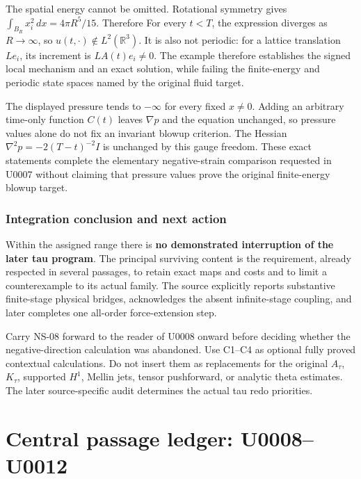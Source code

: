 The spatial energy cannot be omitted. Rotational symmetry gives
\(\int_{B_R}x_i^2\,dx=4\pi R^5/15\). Therefore  For every \(t<T\), the expression diverges as \(R\to\infty\), so
\(u(t,\cdot)\notin L^2(\mathbb R^3)\). It is also not periodic: for a
lattice translation \(Le_i\), its increment is \(LA(t)e_i\ne0\). The
example therefore establishes the signed local mechanism and an exact
solution, while failing the finite-energy and periodic state spaces
named by the original fluid target.

The displayed pressure tends to \(-\infty\) for every fixed \(x\ne0\).
Adding an arbitrary time-only function \(C(t)\) leaves \(\nabla p\) and
the equation unchanged, so pressure values alone do not fix an invariant
blowup criterion. The Hessian \(\nabla^2p=-2(T-t)^{-2}I\) is unchanged
by this gauge freedom. These exact statements complete the elementary
negative-strain comparison requested in U0007 without claiming that
pressure values prove the original finite-energy blowup target.

\subsubsection{Integration conclusion and next
action}\label{TranscriptLedgerStage:integration-conclusion-and-next-action}

Within the assigned range there is \textbf{no demonstrated interruption
of the later tau program}. The principal surviving content is the
requirement, already respected in several passages, to retain exact maps
and costs and to limit a counterexample to its actual family. The source
explicitly reports substantive finite-stage physical bridges,
acknowledges the absent infinite-stage coupling, and later completes one
all-order force-extension step.

Carry NS-08 forward to the reader of U0008 onward before deciding
whether the negative-direction calculation was abandoned. Use C1--C4 as
optional fully proved contextual calculations. Do not insert them as
replacements for the original \(A_\tau\), \(K_\tau\), supported \(H^1\),
Mellin jets, tensor pushforward, or analytic theta estimates. The later
source-specific audit determines the actual tau redo priorities.

\section{Central passage ledger:
U0008--U0012}\label{TranscriptLedgerStage:central-passage-ledger-u0008u0012}

